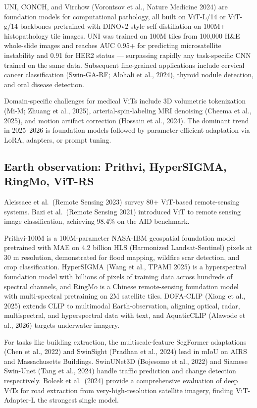 UNI, CONCH, and Virchow (Vorontsov et al., Nature Medicine 2024) are foundation models for computational pathology, all built on ViT-L/14 or ViT-g/14 backbones pretrained with DINOv2-style self-distillation on 100M+ histopathology tile images. UNI was trained on 100M tiles from 100,000 H\&E whole-slide images and reaches AUC 0.95+ for predicting microsatellite instability and 0.91 for HER2 status --- surpassing rapidly any task-specific CNN trained on the same data. Subsequent fine-grained applications include cervical cancer classification (Swin-GA-RF; Alohali et al., 2024), thyroid nodule detection, and oral disease detection.

Domain-specific challenges for medical ViTs include 3D volumetric tokenization (Mi-M; Zhuang et al., 2025), arterial-spin-labeling MRI denoising (Cheema et al., 2025), and motion artifact correction (Hossain et al., 2024). The dominant trend in 2025--2026 is foundation models followed by parameter-efficient adaptation via LoRA, adapters, or prompt tuning.

\subsection{Earth observation: Prithvi, HyperSIGMA, RingMo, ViT-RS}\label{earth-observation-prithvi-hypersigma-ringmo-vit-rs}

Aleissaee et al.~(Remote Sensing 2023) survey 80+ ViT-based remote-sensing systems. Bazi et al.~(Remote Sensing 2021) introduced ViT to remote sensing image classification, achieving 98.4\% on the AID benchmark.

Prithvi-100M is a 100M-parameter NASA-IBM geospatial foundation model pretrained with MAE on 4.2 billion HLS (Harmonized Landsat-Sentinel) pixels at 30 m resolution, demonstrated for flood mapping, wildfire scar detection, and crop classification. HyperSIGMA (Wang et al., TPAMI 2025) is a hyperspectral foundation model with billions of pixels of training data across hundreds of spectral channels, and RingMo is a Chinese remote-sensing foundation model with multi-spectral pretraining on 2M satellite tiles. DOFA-CLIP (Xiong et al., 2025) extends CLIP to multimodal Earth-observation, aligning optical, radar, multispectral, and hyperspectral data with text, and AquaticCLIP (Alawode et al., 2026) targets underwater imagery.

For tasks like building extraction, the multiscale-feature SegFormer adaptations (Chen et al., 2022) and SwinSight (Pradhan et al., 2024) lead in mIoU on AIRS and Massachusetts Buildings. SwinUNet3D (Bojesomo et al., 2022) and Siamese Swin-Unet (Tang et al., 2024) handle traffic prediction and change detection respectively. Bolcek et al.~(2024) provide a comprehensive evaluation of deep ViTs for road extraction from very-high-resolution satellite imagery, finding ViT-Adapter-L the strongest single model.

